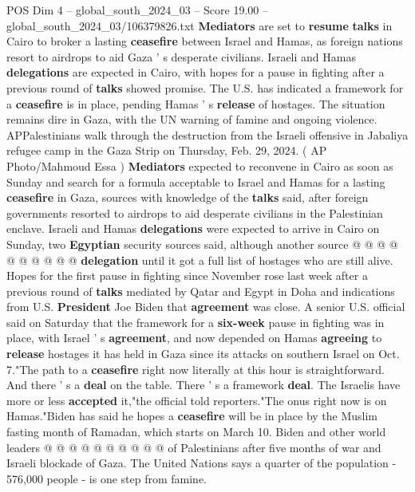 \begin{textsample}{POS Dim 4 – global\_south\_2024\_03 – Score 19.00 – global\_south\_2024\_03/106379826.txt}  \label{ex:f4_pos_106}
\textbf{Mediators} are set to \textbf{resume} \textbf{talks} in Cairo to broker a lasting \textbf{ceasefire} between Israel and Hamas, as foreign nations resort to airdrops to aid Gaza ' s desperate civilians.
Israeli and Hamas \textbf{delegations} are expected in Cairo, with hopes for a pause in fighting after a previous round of \textbf{talks} showed promise.
The U.S. has indicated a framework for a \textbf{ceasefire} is in place, pending Hamas ' s \textbf{release} of hostages.
The situation remains dire in Gaza, with the UN warning of famine and ongoing violence.
APPalestinians walk through the destruction from the Israeli offensive in Jabaliya refugee camp in the Gaza Strip on Thursday, Feb. 29, 2024. ( AP Photo/Mahmoud Essa ) \textbf{Mediators} expected to reconvene in Cairo as soon as Sunday and search for a formula acceptable to Israel and Hamas for a lasting \textbf{ceasefire} in Gaza, sources with knowledge of the \textbf{talks} said, after foreign governments resorted to airdrops to aid desperate civilians in the Palestinian enclave.
Israeli and Hamas \textbf{delegations} were expected to arrive in Cairo on Sunday, two \textbf{Egyptian} security sources said, although another source @ @ @ @ @ @ @ @ @ @ \textbf{delegation} until it got a full list of hostages who are still alive.
Hopes for the first pause in fighting since November rose last week after a previous round of \textbf{talks} mediated by Qatar and Egypt in Doha and indications from U.S. \textbf{President} Joe Biden that \textbf{agreement} was close.
A senior U.S. official said on Saturday that the framework for a \textbf{six-week} pause in fighting was in place, with Israel ' s \textbf{agreement}, and now depended on Hamas \textbf{agreeing} to \textbf{release} hostages it has held in Gaza since its attacks on southern Israel on Oct. 7."The path to a \textbf{ceasefire} right now literally at this hour is straightforward.
And there ' s a \textbf{deal} on the table.
There ' s a framework \textbf{deal}.
The Israelis have more or less \textbf{accepted} it,"the official told reporters."The onus right now is on Hamas."Biden has said he hopes a \textbf{ceasefire} will be in place by the Muslim fasting month of Ramadan, which starts on March 10.
Biden and other world leaders @ @ @ @ @ @ @ @ @ @ of Palestinians after five months of war and Israeli blockade of Gaza.
The United Nations says a quarter of the population - 576,000 people - is one step from famine.

\end{textsample}
